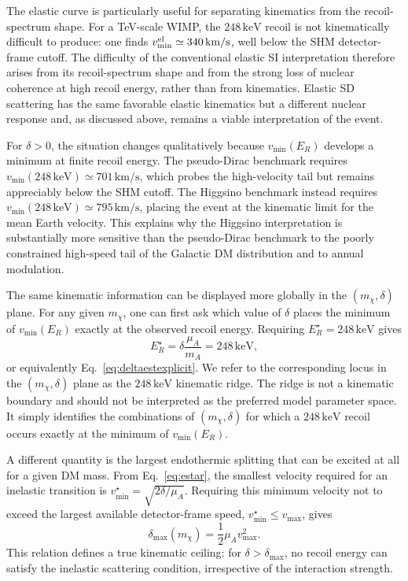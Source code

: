 \documentclass[aps,prd,reprint,superscriptaddress,nofootinbib,longbibliography,floatfix]{revtex4-2}
\newcommand{\keV}{\mathrm{keV}}
\begin{document}
The elastic curve is particularly useful for separating kinematics from the recoil-spectrum shape. For a TeV-scale WIMP, the $248\,\keV$ recoil is not kinematically difficult to produce: one finds $v_{\min}^{\rm el}\simeq340\,\mathrm{km/s}$, well below the SHM detector-frame cutoff. The difficulty of the conventional elastic SI interpretation therefore arises from its recoil-spectrum shape and from the strong loss of nuclear coherence at high recoil energy, rather than from kinematics. Elastic SD scattering has the same favorable elastic kinematics but a different nuclear response and, as discussed above, remains a viable interpretation of the event.

For $\delta>0$, the situation changes qualitatively because $v_{\min}(E_R)$ develops a minimum at finite recoil energy. The pseudo-Dirac benchmark requires $v_{\min}(248\,\keV)\simeq701\,\mathrm{km/s}$, which probes the high-velocity tail but remains appreciably below the SHM cutoff. The Higgsino benchmark instead requires $v_{\min}(248\,\keV)\simeq795\,\mathrm{km/s}$, placing the event at the kinematic limit for the mean Earth velocity. This explains why the Higgsino interpretation is substantially more sensitive than the pseudo-Dirac benchmark to the poorly constrained high-speed tail of the Galactic DM distribution and to annual modulation.

The same kinematic information can be displayed more globally in the $(m_\chi,\delta)$ plane. For any given $m_\chi$, one can first ask which value of $\delta$ places the minimum of $v_{\min}(E_R)$ exactly at the observed recoil energy. Requiring $E_R^\star=248\,\keV$ gives
\begin{equation}
E_R^\star=\delta\frac{\mu_A}{m_A}=248\,\keV,
\end{equation}
or equivalently Eq.~\eqref{eq:deltaestexplicit}. We refer to the corresponding locus in the $(m_\chi,\delta)$ plane as the $248\,\keV$ kinematic ridge. The ridge is not a kinematic boundary and should not be interpreted as the preferred model parameter space. It simply identifies the combinations of $(m_\chi,\delta)$ for which a $248\,\keV$ recoil occurs exactly at the minimum of $v_{\min}(E_R)$.

A different quantity is the largest endothermic splitting that can be excited at all for a given DM mass. From Eq.~\eqref{eq:estar}, the smallest velocity required for an inelastic transition is $v_{\min}^{\star}=\sqrt{2\delta/\mu_A}$. Requiring this minimum velocity not to exceed the largest available detector-frame speed, $v_{\min}^{\star}\leq v_{\max}$, gives
\begin{equation}
\delta_{\max}(m_\chi)=\frac{1}{2}\mu_A v_{\max}^2.
\label{eq:deltamax}
\end{equation}
This relation defines a true kinematic ceiling: for $\delta>\delta_{\max}$, no recoil energy can satisfy the inelastic scattering condition, irrespective of the interaction strength.
\end{document}
